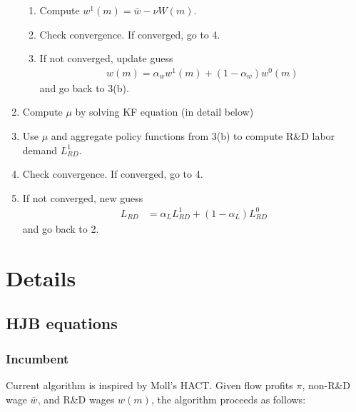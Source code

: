 \documentclass[12pt,english]{article}
\theoremstyle{remark}
\begin{document}
\begin{enumerate}
\begin{enumerate}
		\item Compute $w^1(m) =  \bar{w} - \nu W(m)$.
		\item Check convergence. If converged, go to 4. 
		\item If not converged, update guess 
		\begin{align*}
			w(m) = \alpha_w w^1(m) + (1-\alpha_w) w^0 (m) 
		\end{align*} 
		and go back to 3(b).
	\end{enumerate}
	\item Compute $\mu$ by solving KF equation (in detail below) 
	\item Use $\mu$ and aggregate policy functions from 3(b) to compute R\&D labor demand $L^1_{RD}$.
	\item Check convergence. If converged, go to 4. 
	\item If not converged, new guess
	\begin{align*}
	L_{RD} &= \alpha_L L^1_{RD} + (1-\alpha_L) L^0_{RD} 
	\end{align*}
	and go back to 2. 
\end{enumerate}

\section{Details}

\subsection{HJB equations}

\subsubsection{Incumbent}

Current algorithm is inspired by Moll's HACT. Given flow profits $\pi$, non-R\&D wage $\bar{w}$, and R\&D wages $w(m)$, the algorithm proceeds as follows:
\end{document}
